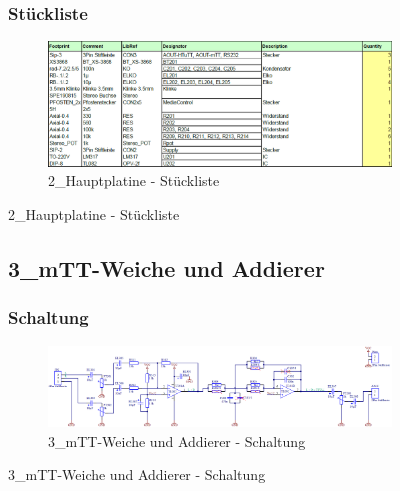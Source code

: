 \begin{figure}
	\subsubsection*{Stückliste}
	\begin{figure} [H]
		\centering
		\includegraphics[width=1\textwidth]{img/BTModul/hauptboard_Blist.png}
		\caption{2\_Hauptplatine - Stückliste}
		\label {fig:8.10.9}
	\end{figure}
\end{figure}


\begin{figure}
	\subsection{3\_mTT-Weiche und Addierer}
	\subsubsection*{Schaltung}
	\begin{figure} [H]
		\centering
		\includegraphics[width=1\textwidth]{img/Print3/3mTTWeicheruAddiererDiplSchematic.png}
		\caption{3\_mTT-Weiche und Addierer - Schaltung}
		\label {fig:8.10.10}
	\end{figure}
\end{figure}

